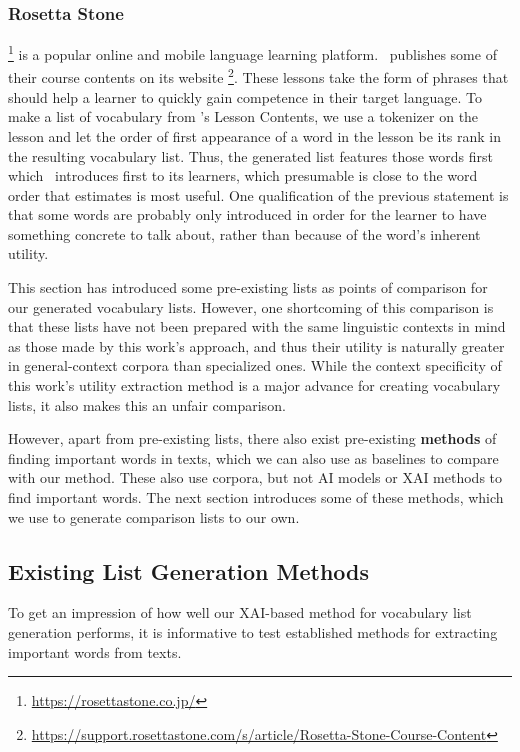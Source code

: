 \subsubsection{Rosetta Stone}
\Rosetta \footnote{\url{https://rosettastone.co.jp/}} is a popular online and mobile language learning platform.
\Rosetta\ publishes some of their course contents on its website \footnote{\url{https://support.rosettastone.com/s/article/Rosetta-Stone-Course-Content}}.
These lessons take the form of phrases that should help a learner to quickly gain competence in their target language.
To make a list of vocabulary from \Rosetta 's Lesson Contents, we use a tokenizer on the lesson and let the order of first appearance of a word in the lesson be its rank in the resulting vocabulary list.
Thus, the generated list features those words first which \Rosetta\ introduces first to its learners, which presumable is close to the word order that \Rosetta estimates is most useful.
One qualification of the previous statement is that some words are probably only introduced in order for the learner to have something concrete to talk about, rather than because of the word's inherent utility.



This section has introduced some pre-existing lists as points of comparison for our generated vocabulary lists.
However, one shortcoming of this comparison is that these lists have not been prepared with the same linguistic contexts in mind as those made by this work's approach, and thus their utility is naturally greater in general-context corpora than specialized ones.
While the context specificity of this work's utility extraction method is a major advance for creating vocabulary lists, it also makes this an unfair comparison.

However, apart from pre-existing lists, there also exist pre-existing \textbf{methods} of finding important words in texts, which we can also use as baselines to compare with our method.
These also use corpora, but not AI models or XAI methods to find important words.
The next section introduces some of these methods, which we use to generate comparison lists to our own.


\subsection{Existing List Generation Methods}
To get an impression of how well our XAI-based method for vocabulary list generation performs, it is informative to test established methods for extracting important words from texts.

